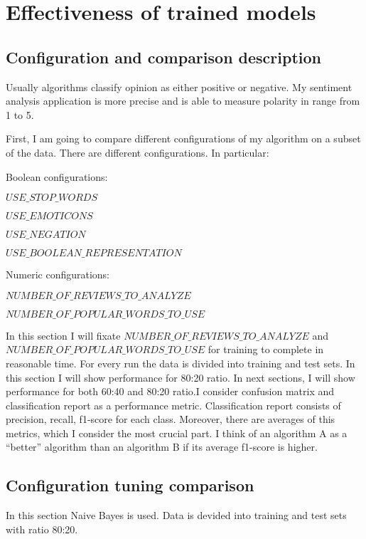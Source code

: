 \documentclass[12pt]{report}
\begin{document}
\newpage

\chapter{Effectiveness of trained models}

\section{Configuration and comparison description}

Usually algorithms classify opinion as either positive or negative. My sentiment analysis application is more precise and is able to measure polarity in range from 1 to 5.

First, I am going to compare different configurations of my algorithm on a subset of the data. There are different configurations. In particular:

Boolean configurations:

$USE\_STOP\_WORDS$

$USE\_EMOTICONS$

$USE\_NEGATION$

$USE\_BOOLEAN\_REPRESENTATION$

Numeric configurations:

$NUMBER\_OF\_REVIEWS\_TO\_ANALYZE$

$NUMBER\_OF\_POPULAR\_WORDS\_TO\_USE$

In this section I will fixate $NUMBER\_OF\_REVIEWS\_TO\_ANALYZE$ and $NUMBER\_OF\_POPULAR\_WORDS\_TO\_USE$ for training to complete in reasonable time. For every run the data is divided into training and test sets. In this section I will show performance for 80:20 ratio. In next sections, I will show performance for both 60:40 and 80:20 ratio.I consider confusion matrix and classification report as a performance metric.
Classification report consists of precision, recall, f1-score for each class. Moreover, there are averages of this metrics, which I consider the most crucial part. I think of an algorithm A as a “better” algorithm than an algorithm B if its average f1-score is higher.

\newpage

\section{Configuration tuning comparison}

In this section Naive Bayes is used. Data is devided into training and test sets with ratio 80:20.
\end{document}
